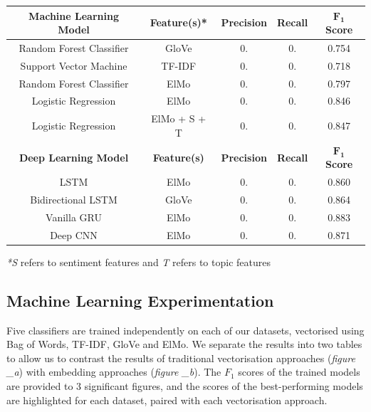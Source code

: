 \documentclass[12pt,a4paper]{article}
\begin{document}
\begin{center}
	\begin{tabular}{ |c||c|c|c|c|}
		\hline
		\textbf{Machine Learning Model}& \textbf{Feature(s)*} & \textbf{Precision} & \textbf{Recall} & \textbf{$\mathbf{F_1}$ Score}\\
		\hline\hline
		Random Forest Classifier & GloVe  & 0.   & 0. & 0.754\\
		Support Vector Machine & TF-IDF  & 0.   & 0. & 0.718\\
		Random Forest Classifier & ElMo  & 0.   & 0. & 0.797\\
		Logistic Regression & ElMo  & 0.   & 0. & 0.846\\
		Logistic Regression & ElMo + S + T & 0.   & 0. & 0.847\\
		\hline\hline
		\textbf{Deep Learning Model}& \textbf{Feature(s)} & \textbf{Precision} & \textbf{Recall} & \textbf{$\mathbf{F_1}$ Score}\\
		\hline
		LSTM & ElMo  & 0.   & 0. & 0.860\\
		Bidirectional LSTM & GloVe  & 0.   & 0. & 0.864\\
		Vanilla GRU & ElMo  & 0.   & 0. & 0.883\\
		Deep CNN & ElMo & 0.   & 0. & 0.871\\
		\hline
	\end{tabular}
\end{center}
\textit{*S} refers to sentiment features and \textit{T} refers to topic features




\subsection{Machine Learning Experimentation}


\noindent Five classifiers are trained independently on each of our datasets, vectorised using Bag of Words, TF-IDF, GloVe and ElMo. We separate the results into two tables to allow us to contrast the results of traditional vectorisation approaches (\textit{figure \_a}) with embedding approaches (\textit{figure \_b}). The $F_{1}$ scores of the trained models are provided to 3 significant figures, and the scores of the best-performing models are highlighted for each dataset, paired with each vectorisation approach.\\
\end{document}
